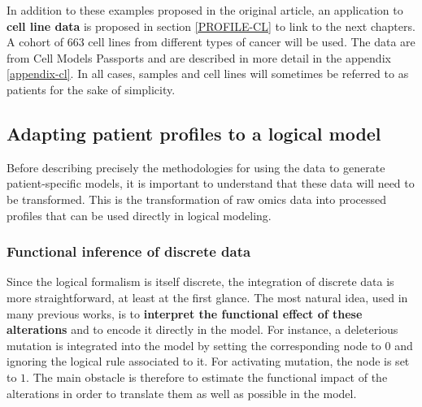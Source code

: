 \documentclass[a4paper,12pt,twoside,onecolumn,openright,final,oldfontcommands]{memoir}
\begin{document}
In addition to these examples proposed in the original article, an
application to \textbf{cell line data} is proposed in section
\ref{PROFILE-CL} to link to the next chapters. A cohort of 663 cell
lines from different types of cancer will be used. The data are from
Cell Models Passports \citep{van2019cell} and are described in more
detail in the appendix \ref{appendix-cl}. In all cases, samples and cell
lines will sometimes be referred to as patients for the sake of
simplicity.

\subsection{Adapting patient profiles to a logical
model}\label{adapting-patient-profiles-to-a-logical-model}

Before describing precisely the methodologies for using the data to
generate patient-specific models, it is important to understand that
these data will need to be transformed. This is the transformation of
raw omics data into processed profiles that can be used directly in
logical modeling.

\subsubsection{Functional inference of discrete
data}\label{functional-inference-of-discrete-data}

Since the logical formalism is itself discrete, the integration of
discrete data is more straightforward, at least at the first glance. The
most natural idea, used in many previous works, is to \textbf{interpret
the functional effect of these alterations} and to encode it directly in
the model. For instance, a deleterious mutation is integrated into the
model by setting the corresponding node to \(0\) and ignoring the
logical rule associated to it. For activating mutation, the node is set
to \(1\). The main obstacle is therefore to estimate the functional
impact of the alterations in order to translate them as well as possible
in the model.
\end{document}
